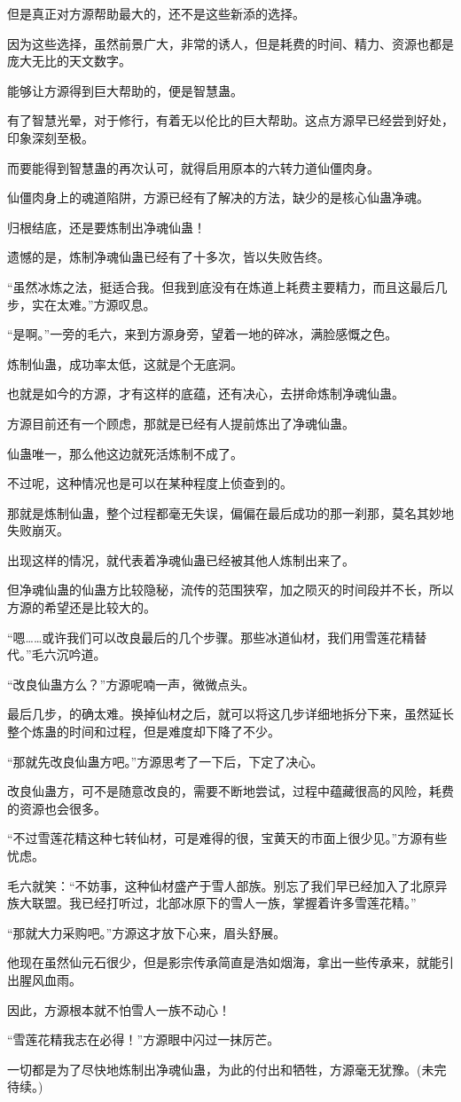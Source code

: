 \begin{this_body}
但是真正对方源帮助最大的，还不是这些新添的选择。

因为这些选择，虽然前景广大，非常的诱人，但是耗费的时间、精力、资源也都是庞大无比的天文数字。

能够让方源得到巨大帮助的，便是智慧蛊。

有了智慧光晕，对于修行，有着无以伦比的巨大帮助。这点方源早已经尝到好处，印象深刻至极。

而要能得到智慧蛊的再次认可，就得启用原本的六转力道仙僵肉身。

仙僵肉身上的魂道陷阱，方源已经有了解决的方法，缺少的是核心仙蛊净魂。

归根结底，还是要炼制出净魂仙蛊！

遗憾的是，炼制净魂仙蛊已经有了十多次，皆以失败告终。

“虽然冰炼之法，挺适合我。但我到底没有在炼道上耗费主要精力，而且这最后几步，实在太难。”方源叹息。

“是啊。”一旁的毛六，来到方源身旁，望着一地的碎冰，满脸感慨之色。

炼制仙蛊，成功率太低，这就是个无底洞。

也就是如今的方源，才有这样的底蕴，还有决心，去拼命炼制净魂仙蛊。

方源目前还有一个顾虑，那就是已经有人提前炼出了净魂仙蛊。

仙蛊唯一，那么他这边就死活炼制不成了。

不过呢，这种情况也是可以在某种程度上侦查到的。

那就是炼制仙蛊，整个过程都毫无失误，偏偏在最后成功的那一刹那，莫名其妙地失败崩灭。

出现这样的情况，就代表着净魂仙蛊已经被其他人炼制出来了。

但净魂仙蛊的仙蛊方比较隐秘，流传的范围狭窄，加之陨灭的时间段并不长，所以方源的希望还是比较大的。

“嗯……或许我们可以改良最后的几个步骤。那些冰道仙材，我们用雪莲花精替代。”毛六沉吟道。

“改良仙蛊方么？”方源呢喃一声，微微点头。

最后几步，的确太难。换掉仙材之后，就可以将这几步详细地拆分下来，虽然延长整个炼蛊的时间和过程，但是难度却下降了不少。

“那就先改良仙蛊方吧。”方源思考了一下后，下定了决心。

改良仙蛊方，可不是随意改良的，需要不断地尝试，过程中蕴藏很高的风险，耗费的资源也会很多。

“不过雪莲花精这种七转仙材，可是难得的很，宝黄天的市面上很少见。”方源有些忧虑。

毛六就笑：“不妨事，这种仙材盛产于雪人部族。别忘了我们早已经加入了北原异族大联盟。我已经打听过，北部冰原下的雪人一族，掌握着许多雪莲花精。”

“那就大力采购吧。”方源这才放下心来，眉头舒展。

他现在虽然仙元石很少，但是影宗传承简直是浩如烟海，拿出一些传承来，就能引出腥风血雨。

因此，方源根本就不怕雪人一族不动心！

“雪莲花精我志在必得！”方源眼中闪过一抹厉芒。

一切都是为了尽快地炼制出净魂仙蛊，为此的付出和牺牲，方源毫无犹豫。(未完待续。)

\end{this_body}

